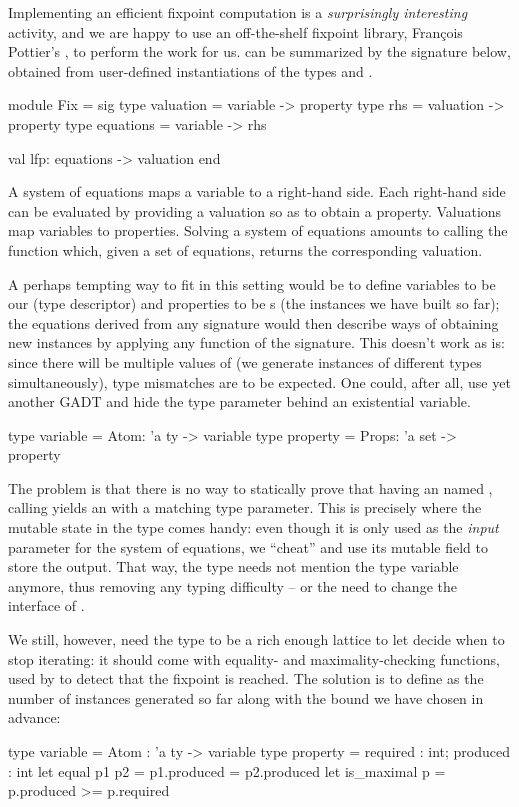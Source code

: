 Implementing an efficient fixpoint computation is a \emph{surprisingly
interesting} activity, and we are happy to use an off-the-shelf fixpoint
library, François Pottier's ,
to perform the work for us.  can be summarized by the signature
below, obtained from user-defined instantiations of the types 
and .
%
\begin{ocamlcode}
module Fix = sig
  type valuation = variable -> property
  type rhs = valuation -> property
  type equations = variable -> rhs

  val lfp: equations -> valuation
end
\end{ocamlcode}
%
A system of equations maps a variable to a right-hand side.  Each right-hand
side can be evaluated by providing a valuation so as to obtain a property.
Valuations map variables to properties. Solving a system of equations amounts to
calling the  function which, given a set of equations, returns the
corresponding valuation.

A perhaps tempting way to fit in this setting would be to define variables to be
our  (type descriptor) and properties to be s (the
instances we have built so far); the equations derived from any signature would
then describe ways of obtaining new instances by applying any function of the
signature. This doesn't work as is: since there will be multiple values of
 (we generate instances of different types simultaneously), type
mismatches are to be expected. One could, after all, use yet another GADT and
hide the  type parameter behind an existential variable.
%
\begin{ocamlcode}
  type variable = Atom: 'a ty -> variable
  type property = Props: 'a set -> property
\end{ocamlcode}
%
The problem is that there is no way to statically prove that having an
 named , calling  yields an
 with a matching type parameter. This is precisely
where the mutable state in the  type comes handy: even though it is
only used as the \emph{input} parameter for the system of equations, we
``cheat'' and use its mutable  field to store the output. That way,
the  type needs not mention the type variable  anymore,
thus removing any typing difficulty -- or the need to change the interface of
.

We still, however, need the  type to be a rich enough lattice to
let  decide when to stop iterating: it should come with equality- and
maximality-checking functions, used by  to detect that the fixpoint is
reached. The solution is to define  as the number of instances
generated so far along with the bound we have chosen in advance:
%
\begin{ocamlcode}
  type variable = Atom : 'a ty -> variable
  type property = { required : int; produced : int }
  let equal p1 p2 = p1.produced = p2.produced
  let is_maximal p = p.produced >= p.required
\end{ocamlcode}
%
